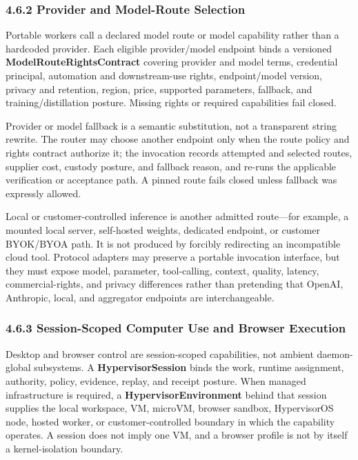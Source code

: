 \documentclass[
  11pt,
]{article}
\begin{document}
\hypertarget{provider-swapping-the-local-routing-table}{%
\subsubsection{4.6.2 Provider and Model-Route
Selection}\label{provider-swapping-the-local-routing-table}}

Portable workers call a declared model route or model capability rather than a
hardcoded provider. Each eligible provider/model endpoint binds a versioned
\textbf{ModelRouteRightsContract} covering provider and model terms, credential
principal, automation and downstream-use rights, endpoint/model version,
privacy and retention, region, price, supported parameters, fallback, and
training/distillation posture. Missing rights or required capabilities fail
closed.

Provider or model fallback is a semantic substitution, not a transparent string
rewrite. The router may choose another endpoint only when the route policy and
rights contract authorize it; the invocation records attempted and selected
routes, supplier cost, custody posture, and fallback reason, and re-runs the
applicable verification or acceptance path. A pinned route fails closed unless
fallback was expressly allowed.

Local or customer-controlled inference is another admitted route---for example,
a mounted local server, self-hosted weights, dedicated endpoint, or customer
BYOK/BYOA path. It is not produced by forcibly redirecting an incompatible
cloud tool. Protocol adapters may preserve a portable invocation interface, but
they must expose model, parameter, tool-calling, context, quality, latency,
commercial-rights, and privacy differences rather than pretending that OpenAI,
Anthropic, local, and aggregator endpoints are interchangeable.

\hypertarget{kinetic-drivers-browser-subsystem}{%
\subsubsection{4.6.3 Session-Scoped Computer Use and Browser
Execution}\label{kinetic-drivers-browser-subsystem}}

Desktop and browser control are session-scoped capabilities, not ambient
daemon-global subsystems. A \textbf{HypervisorSession} binds the work,
runtime assignment, authority, policy, evidence, replay, and receipt posture.
When managed infrastructure is required, a \textbf{HypervisorEnvironment}
behind that session supplies the local workspace, VM, microVM, browser sandbox,
HypervisorOS node, hosted worker, or customer-controlled boundary in which the
capability operates. A session does not imply one VM, and a browser profile is
not by itself a kernel-isolation boundary.
\end{document}
